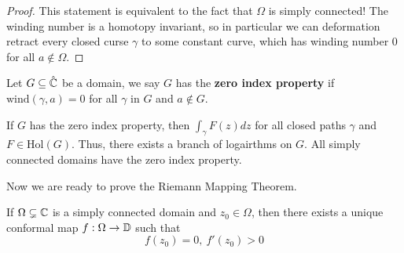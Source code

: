 \begin{proof}
    This statement is equivalent to the fact that $\Omega$ is simply connected! The winding number is a homotopy invariant, so in particular we can deformation retract every closed curse $\gamma$ to some constant curve, which has winding number $0$ for all $a \notin \Omega$.
\end{proof}

\begin{definition}
    Let $G \subseteq \hat{\mathbb{C}}$ be a domain, we say $G$ has the \textbf{zero index property} if $\text{wind}(\gamma, a) = 0$ for all $\gamma$ in $G$ and $a \notin G$.
\end{definition}

\begin{remark}
        If $G$ has the zero index property, then $\int_\gamma F(z) dz$ for all closed paths $\gamma$ and $F \in \text{Hol}(G)$. Thus, there exists a branch of logairthms on $G$. All simply connected domains have the zero index property.
\end{remark}

Now we are ready to prove the Riemann Mapping Theorem.

\begin{theorem}
    If $\Omega \subsetneq \mathbb{C}$ is a simply connected domain and $z_0 \in \Omega$, then there exists a unique conformal map $f: \Omega \to \mathbb{D}$ such that
    \[f(z_0) = 0,\ f'(z_0) > 0\]
\end{theorem}

